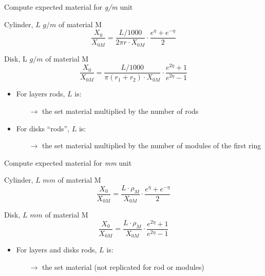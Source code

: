 \documentclass[pdftex, 11pt]{beamer}
\begin{document}
\begin{frame}{Compute expected material for \emph{g/m} unit}
  \begin{block}{Cylinder, \alert{$L$} $g/m$ of material \alert{M}}
    $$
    \frac{X_0}{X_{0M}} = \frac{L/1000}{2\pi r \cdot X_{0M}} \cdot \frac{e^\eta+e^{-\eta}}{2}
    $$
  \end{block}
  \begin{block}{Disk, \alert{L} $g/m$ of material \alert{M}}
    $$
    \frac{X_0}{X_{0M}} = \frac{L/1000}{\pi(r_1+r_2)\cdot X_{0M}}\cdot\frac{e^{2\eta}+1}{e^{2\eta}-1}
    $$
  \end{block}

  \begin{itemize}
  \item For \alert{layers} rods, \alert{$L$} is:
    \begin{itemize}
    \item [$\to$] the set material multiplied by the number of rods
    \end{itemize}
  \item For \alert{disks} ``rods'', \alert{$L$} is:
    \begin{itemize}
    \item [$\to$] the set material multiplied by the number of modules of the first ring
    \end{itemize}
  \end{itemize}
\end{frame}

\begin{frame}{Compute expected material for \emph{mm} unit}
  \begin{block}{Cylinder, \alert{$L$} $mm$ of material \alert{M}}
    $$
    \frac{X_0}{X_{0M}} = \frac{L\cdot\rho_M}{X_{0M}}\cdot\frac{e^\eta+e^{-\eta}}{2}
    $$
  \end{block}
  \begin{block}{Disk, \alert{$L$} $mm$ of material \alert{M}}
    $$
    \frac{X_0}{X_{0M}} = \frac{L\cdot\rho_M}{X_{0M}}\cdot\frac{e^{2\eta}+1}{e^{2\eta}-1}
    $$
  \end{block}

  \begin{itemize}
  \item For \alert{layers} and \alert{disks} rods, \alert{$L$} is:
    \begin{itemize}
    \item[$\to$] the set material (not replicated for rod or modules)
    \end{itemize}
  \end{itemize}
\end{frame}
\end{document}
